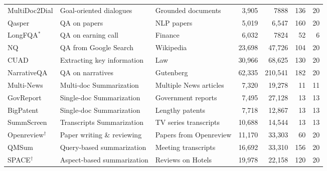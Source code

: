 \begin{table}[t]
{\begin{tabular}{lllrrrr}
\midrule
\rowcolor{mypink!50}
\multicolumn{7}{c}{\textbf{\textit{Open - Ended \, Tasks}}} \\
\midrule
MultiDoc2Dial & Goal-oriented dialogues & Grounded documents & 3,905 & 7888  & 136 & 20 \\
Qasper & QA on papers & NLP papers & 5,019 & 6,547  & 160 & 20 \\
LongFQA$^*$  & QA on earning call & Finance  & 6,032 & 7824  & 52 & 6 \\
NQ & QA from Google Search & Wikipedia & 23,698 & 47,726 & 104 & 20\\
CUAD & Extracting key information & Law & 30,966 & 68,625  & 130 & 20 \\
NarrativeQA & QA on narratives  & Gutenberg  & 62,335  & 210,541 & 182 & 20 \\
\midrule
Multi-News & Multi-doc Summarization & Multiple News articles  & 7,320& 19,278  & 11 &11 \\
GovReport & Single-doc Summarization & Government reports  & 7,495 & 27,128  &13 & 13 \\
BigPatent & Single-doc Summarization & Lengthy patents  & 7,718  & 12,867 & 13 & 13 \\
SummScreen & Transcripts Summarization & TV series transcripts  & 10,688 & 14,544  & 13 & 13 \\
Openreview$^\dag$ & Paper writing \& reviewing & Papers from Openreview  & 11,170 & 33,303 & 60 & 20 \\
QMSum &  Query-based summarization & Meeting transcripts  & 16,692 & 33,310 & 156 & 20 \\
SPACE$^\dag$ & Aspect-based summarization & Reviews on Hotels  &  19,978 & 22,158 & 120 & 20 \\
\bottomrule
\end{tabular}
}

\label{tab:datasets}
\end{table}

